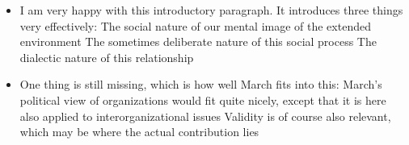 \begin{itemize}
	\item I am very happy with this introductory paragraph. It introduces three things very effectively:
		\subitem The social nature of our mental image of the extended environment
		\subitem The sometimes deliberate nature of this social process
		\subitem The dialectic nature of this relationship
	\item One thing is still missing, which is how well March fits into this:
		\subitem March's political view of organizations would fit quite nicely, except that it is here also applied to interorganizational issues
		\subitem Validity is of course also relevant, which may be where the actual contribution lies
\end{itemize}